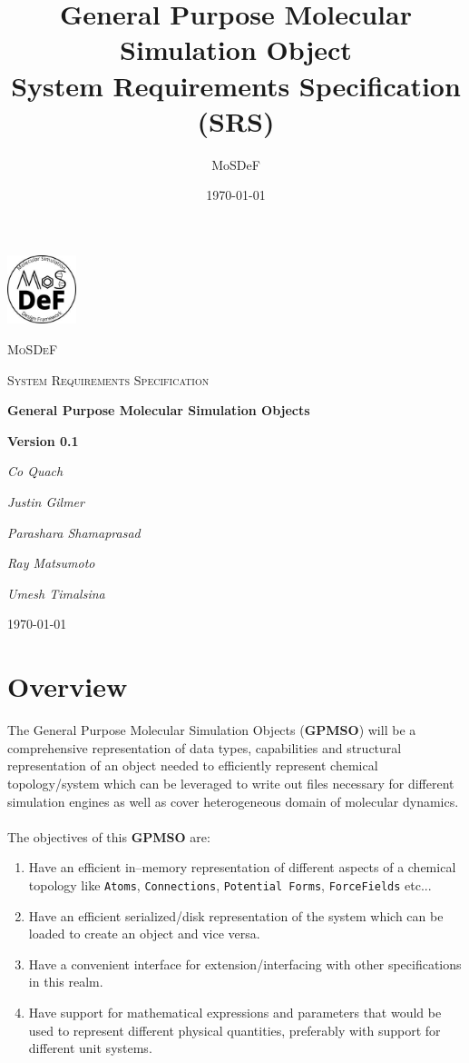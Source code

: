 \documentclass[12pt]{article}
\title{General Purpose Molecular Simulation Object\\ System Requirements Specification (SRS)}
\author{MoSDeF}
\date{\today}
\begin{document}
\begin{titlepage}
	\centering
	\includegraphics[width=0.15\textwidth]{docs/logo}\par\vspace{1cm}
	{\scshape\LARGE MoSDeF \par}
	\vspace{1cm}
	{\scshape\Large System Requirements Specification\par}
	\vspace{1.5cm}
	{\huge\bfseries General Purpose Molecular Simulation Objects\par}
	\vspace{1cm}
	{\huge\bfseries Version 0.1\par}
	\vspace{2cm}
	{\Large\itshape Co Quach\par}
	{\Large\itshape Justin Gilmer\par}
	{\Large\itshape Parashara Shamaprasad\par}
	{\Large\itshape Ray Matsumoto\par}
	{\Large\itshape Umesh Timalsina\par}

	\vfill

	{\large \today\par}
\end{titlepage}

{\centering \section*{Overview}}

The General Purpose Molecular Simulation Objects (\textbf{GPMSO}) will be a comprehensive representation of data types, capabilities and structural representation of an object needed to efficiently represent chemical topology/system which can be leveraged to write out files necessary for different simulation engines as well as cover heterogeneous domain of molecular dynamics. \\~\\
The objectives of this \textbf{GPMSO} are:
\begin{enumerate}
    \item Have an efficient in--memory representation of different aspects of a chemical topology like \texttt{Atoms}, \texttt{Connections}, \texttt{Potential Forms}, \texttt{ForceFields} etc...
    \item Have an efficient serialized/disk representation of the system which can be loaded to create an object and vice versa.
    \item Have a convenient interface for extension/interfacing with other specifications in this realm.
    \item Have support for mathematical expressions and parameters that would be used to represent different physical quantities, preferably with support for different unit systems.
\end{enumerate}
\end{document}
